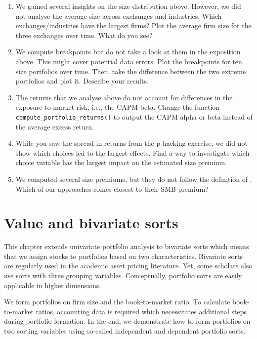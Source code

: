 \documentclass[
]{krantz}
\providecommand{\tightlist}{%
  \setlength{\itemsep}{0pt}\setlength{\parskip}{0pt}}
\begin{document}
\begin{enumerate}
\def\labelenumi{\arabic{enumi}.}
\tightlist
\item
  We gained several insights on the size distribution above. However, we did not analyse the average size across exchanges and industries. Which exchanges/industries have the largest firms? Plot the average firm size for the three exchanges over time. What do you see?
\item
  We compute breakpoints but do not take a look at them in the exposition above. This might cover potential data errors. Plot the breakpoints for ten size portfolios over time. Then, take the difference between the two extreme portfolios and plot it. Describe your results.
\item
  The returns that we analyse above do not account for differences in the exposure to market risk, i.e., the CAPM beta. Change the function \texttt{compute\_portfolio\_returns()} to output the CAPM alpha or beta instead of the average excess return.
\item
  While you saw the spread in returns from the p-hacking exercise, we did not show which choices led to the largest effects. Find a way to investigate which choice variable has the largest impact on the estimated size premium.
\item
  We computed several size premiums, but they do not follow the definition of \citet{Fama1993}. Which of our approaches comes closest to their SMB premium?
\end{enumerate}

\hypertarget{value-and-bivariate-sorts}{%
\chapter{Value and bivariate sorts}\label{value-and-bivariate-sorts}}

This chapter extends univariate portfolio analysis to bivariate sorts which means that we assign stocks to portfolios based on two characteristics. Bivariate sorts are regularly used in the academic asset pricing literature. Yet, some scholars also use sorts with three grouping variables. Conceptually, portfolio sorts are easily applicable in higher dimensions.

We form portfolios on firm size and the book-to-market ratio. To calculate book-to-market ratios, accounting data is required which necessitates additional steps during portfolio formation. In the end, we demonstrate how to form portfolios on two sorting variables using so-called independent and dependent portfolio sorts.
\end{document}
